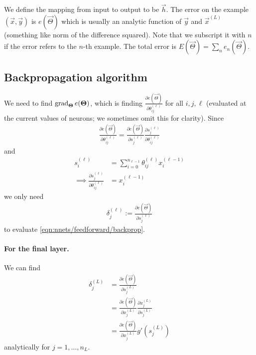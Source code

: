 We define the mapping from input to output to be $\vec h$. The error on the example $(\vec x, \vec y)$ is $e(\vec \Theta)$ which is usually an analytic function of $\vec y$ and $\vec x^{(L)}$ (something like norm of the difference squared). Note that we subscript it with $n$ if the error refers to the $n$-th example. The total error is $E(\vec \Theta) = \sum_n e_n(\vec \Theta)$.

\subsection{Backpropagation algorithm}
We need to find $\operatorname{\mathrm{grad}}_{\boldsymbol{\mathbf{\Theta}}} e(\boldsymbol{\mathbf{\Theta}})$, which is finding $\frac{\partial e(\vec \Theta)}{\partial \theta_{ij}^{(\ell)}}$ for all $i, j, \ell$ (evaluated at the current values of neurons; we sometimes omit this for clarity). Since
\begin{align}
    \frac{\partial e(\vec \Theta)}{\partial \theta_{ij}^{(\ell)}} = \frac{\partial e(\vec \Theta)}{\partial s_j^{(\ell)}} \frac{\partial s_j^{(\ell)}}{\partial \theta_{ij}^{(\ell)}} \label{eqn:nnets/feedforward/backprop}
\end{align}
and
\begin{align}
                s_i^{(\ell)}                                                &= \sum_{i = 0}^{n_{\ell - 1}} \theta_{ij}^{(\ell)} x_i^{(\ell - 1)} \\
    \implies    \frac{\partial s_j^{(\ell)}}{\partial \theta_{ij}^{(\ell)}} &= x_i^{(\ell - 1)}
\end{align}
we only need
\begin{align}
    \delta_j^{(\ell)} := \frac{\partial e(\vec \Theta)}{\partial s_j^{(\ell)}}
\end{align}
to evaluate \eqref{eqn:nnets/feedforward/backprop}.

\paragraph{For the final layer.} We can find
\begin{align}
    \delta_j^{(L)}  &= \frac{\partial e(\vec \Theta)}{\partial s_j^{(L)}} \\
                    &= \frac{\partial e(\vec \Theta)}{\partial x_j^{(L)}} \frac{\partial x_j^{(L)}}{\partial s_j^{(L)}} \\
                    &= \frac{\partial e(\vec \Theta)}{\partial x_j^{(L)}} g'\left(s_j^{(L)}\right) \label{eqn:nnets/feedforward/delta-last}
\end{align}
analytically for $j = 1, \dotsc, n_L$.

